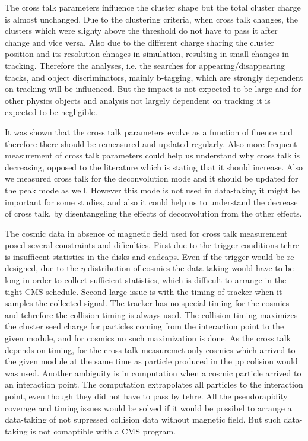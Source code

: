 The cross talk parameters influence the cluster shape but the total cluster charge is almost unchanged. Due to the clustering criteria, when cross talk changes, the clusters which were slighty above the threshold do not have to pass it after change and vice versa. Also due to the different charge sharing the cluster position and its resolution chnages in simulation, resulting in small changes in tracking. Therefore the analyses, i.e. the searches for appearing/disappearing tracks, and object discriminators, mainly b-tagging, which are strongly dependent on tracking will be influenced. But the impact is not expected to be large and for other physics objects and analysis not largely dependent on tracking it is expected to be negligible. 

It was shown that the cross talk parameters evolve as a function of fluence and therefore there should be remeasured and updated regularly. Also more frequent measurement of cross talk parameters could help us understand why cross talk is decreasing, opposed to the literature which is stating that it should increase. Also we measured cross talk for the deconvolution mode and it should be updated for the peak mode as well. However this mode is not used in data-taking it might be important for some studies, and also it could help us to understand the decrease of cross talk, by disentangeling the effects of deconvolution from the other effects.

The cosmic data in absence of magnetic field used for cross talk measurement posed several constraints and dificulties. First due to the trigger conditions tehre is insufficent statistics in the disks and endcaps. Even if the trigger would be re-designed, due to the $\eta$ distribution of cosmics the data-taking would have to be long in order to collect sufficient statistics, which is difficult to arrange in the tight CMS schedule. Second large issue is with the timing of tracker when it samples the collected signal. The tracker has no special timing for the cosmics and tehrefore the collision timing is always used. The collision timing maximizes the cluster seed charge for particles coming from the interaction point to the given module, and for cosmics no such maximization is done. As the cross talk depends on timing, for the cross talk measuremet only cosmics which arrived to the given module at the same time as particle produced in the pp colision would was used. Another ambiguity is in computation when a cosmic particle arrived to an interaction point. The computation extrapolates all particles to the interaction point, even though they did not have to pass by tehre. All the pseudorapidity coverage and timing issues would be solved if it would be possibel to arrange a data-taking of not supressed collision data without magnetic field. But such data-taking is not comaptible with a CMS program.

